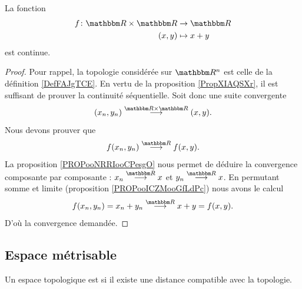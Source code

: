 \begin{lemma}       \label{LEMooGKIPooWgpFTB}
    La fonction
    \begin{equation}
        \begin{aligned}
            f\colon \eR\times \eR&\to \eR \\
            (x,y)&\mapsto x+y 
        \end{aligned}
    \end{equation}
    est continue.
\end{lemma}

\begin{proof}
    Pour rappel, la topologie considérée sur \( \eR^n\) est celle de la définition \ref{DefFAJgTCE}. En vertu de la proposition \ref{PropXIAQSXr}, il est suffisant de prouver la continuité séquentielle. Soit donc une suite convergente
    \begin{equation}
        (x_n,y_n)\stackrel{\eR\times \eR}{\longrightarrow}(x,y).
    \end{equation}
    Nous devons prouver que
    \begin{equation}
        f(x_n,y_n)\stackrel{\eR}{\longrightarrow}f(x,y).
    \end{equation}
    La proposition \ref{PROPooNRRIooCPesgO} nous permet de déduire la convergence composante par composante : \( x_n\stackrel{\eR}{\longrightarrow}x\) et \( y_n\stackrel{\eR}{\longrightarrow}x\). En permutant somme et limite (proposition \ref{PROPooICZMooGfLdPc}) nous avons le calcul
    \begin{equation}
        f(x_n,y_n)=x_n+y_n\stackrel{\eR}{\longrightarrow}x+y=f(x,y).
    \end{equation}
    D'où la convergence demandée.
\end{proof}

\subsection{Espace métrisable}

\begin{definition}
    Un espace topologique est  si il existe une distance compatible avec la topologie.
\end{definition}

